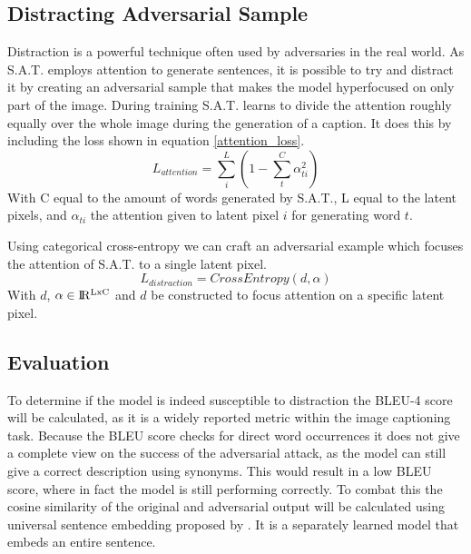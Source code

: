 \subsection*{Distracting Adversarial Sample}
Distraction is a powerful technique often used by adversaries in the real world. As S.A.T. employs attention to generate sentences, it is possible to try and distract it by creating an adversarial sample that makes the model hyperfocused on only part of the image. During training S.A.T. learns to divide the attention roughly equally over the whole image during the generation of a caption. It does this by including the loss shown in equation \ref{attention_loss}.
\begin{equation}
    L_{attention} = \sum^{L}_i (1 - \sum^{C}_{t} \alpha_{ti}^2)
    \label{attention_loss}
\end{equation}
\noindent With C equal to the amount of words generated by S.A.T., L equal to the latent pixels, and $\alpha_{ti}$ the attention given to latent pixel $i$ for generating word $t$.

Using categorical cross-entropy we can craft an adversarial example which focuses the attention of S.A.T. to a single latent pixel.
\begin{equation}
    L_{distraction} = CrossEntropy(d, \alpha)
    \label{distraction_loss}
\end{equation}
With $d$, $\alpha \in \rm I\!R^{LxC}$ and $d$ be constructed to focus attention on a specific latent pixel.

\subsection{Evaluation}
To determine if the model is indeed susceptible to distraction the BLEU-4 score \cite{papineni_roukos_ward_zhu_2001} will be calculated, as it is a widely reported metric within the image captioning task. Because the BLEU score checks for direct word occurrences it does not give a complete view on the success of the adversarial attack, as the model can still give a correct description using synonyms. This would result in a low BLEU score, where in fact the model is still performing correctly. To combat this the cosine similarity of the original and adversarial output will be calculated using universal sentence embedding proposed by \citeauthor{DBLP:journals/corr/abs-1803-11175}. It is a separately learned model that embeds an entire sentence.
